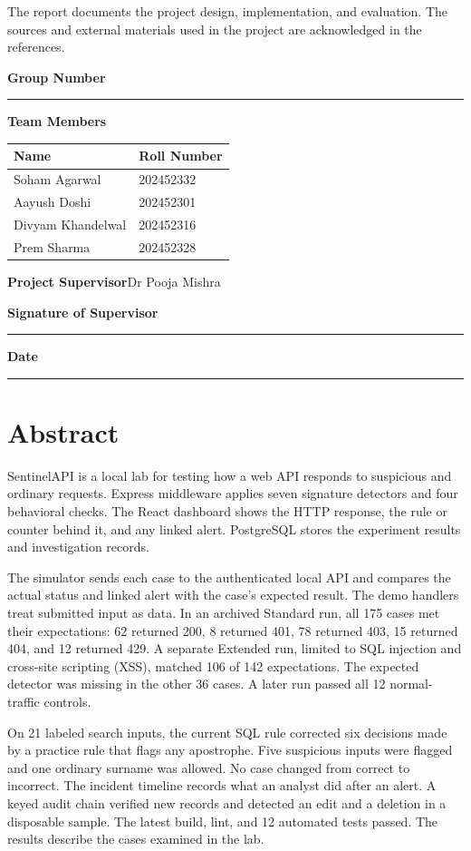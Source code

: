\documentclass[11pt,a4paper,oneside]{report}
\newcommand{\Supervisor}{Dr Pooja Mishra}
\newcommand{\TeamRows}{Soham Agarwal & 202452332\\Aayush Doshi & 202452301\\Divyam Khandelwal & 202452316\\Prem Sharma & 202452328\\}
\begin{document}
The report documents the project design, implementation, and evaluation. The sources and external materials used in the project are acknowledged in the references.

\medskip
\textbf{Group Number}\quad\rule{2.35in}{.4pt}

\medskip
\textbf{Team Members}
\begin{center}
\renewcommand{\arraystretch}{1.3}%
\begin{tabular}{@{}p{.51\linewidth}p{.26\linewidth}@{}}
\toprule
\textbf{Name} & \textbf{Roll Number}\\
\midrule
\TeamRows
\bottomrule
\end{tabular}
\end{center}
\bigskip
\textbf{Project Supervisor}\quad \Supervisor

\vspace{.75in}
\textbf{Signature of Supervisor}\quad\rule{2.3in}{.4pt}

\textbf{Date}\quad\rule{2.3in}{.4pt}

\chapter*{Abstract}
SentinelAPI is a local lab for testing how a web API responds to suspicious and ordinary requests. Express middleware applies seven signature detectors and four behavioral checks. The React dashboard shows the HTTP response, the rule or counter behind it, and any linked alert. PostgreSQL stores the experiment results and investigation records.

The simulator sends each case to the authenticated local API and compares the actual status and linked alert with the case's expected result. The demo handlers treat submitted input as data. In an archived Standard run, all 175 cases met their expectations: 62 returned 200, 8 returned 401, 78 returned 403, 15 returned 404, and 12 returned 429. A separate Extended run, limited to SQL injection and cross-site scripting (XSS), matched 106 of 142 expectations. The expected detector was missing in the other 36 cases. A later run passed all 12 normal-traffic controls.

On 21 labeled search inputs, the current SQL rule corrected six decisions made by a practice rule that flags any apostrophe. Five suspicious inputs were flagged and one ordinary surname was allowed. No case changed from correct to incorrect. The incident timeline records what an analyst did after an alert. A keyed audit chain verified new records and detected an edit and a deletion in a disposable sample. The latest build, lint, and 12 automated tests passed. The results describe the cases examined in the lab.
\end{document}
